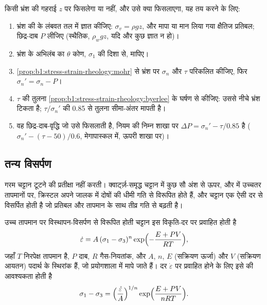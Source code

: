 \begin{method}[भ्रंश के फिसलने की जाँच]
\label{met:b1:stress-strain-rheology:slip-test}
किसी भ्रंश की गहराई $z$ पर फिसलेगा या नहीं, और उसे क्या फिसलाएगा, यह तय करने के लिए:
\begin{enumerate}
  \item भ्रंश की  के लंबवत तल में  ज्ञात कीजिए: $\sigma_v = \rho g z$, और मापा या मान लिया गया क्षैतिज प्रतिबल; छिद्र-दाब $P$ लीजिए (स्थैतिक, $\rho_w g z$, यदि और कुछ ज्ञात न हो)।
  \item भ्रंश के अभिलंब का $\theta$ कोण, $\sigma_1$ की दिशा से, मापिए।
  \item \cref{prop:b1:stress-strain-rheology:mohr} से भ्रंश पर $\sigma_n$ और $\tau$ परिकलित कीजिए, फिर $\sigma_n' = \sigma_n - P$।
  \item $\tau$ की तुलना \cref{prop:b1:stress-strain-rheology:byerlee} के घर्षण से कीजिए: उससे नीचे भ्रंश टिकता है; $\tau/\sigma_n'$ की 0.85 से तुलना सीमा-अंतर मापती है।
  \item वह छिद्र-दाब-वृद्धि जो उसे फिसलाती है, नियम की निम्न शाखा पर $\Delta P = \sigma_n' - \tau/0.85$ है ($\sigma_n' - (\tau - 50)/0.6$, मेगापास्कल में, ऊपरी शाखा पर)।
\end{enumerate}
\end{method}

\subsection*{तन्य विसर्पण}

गरम चट्टान टूटने की प्रतीक्षा नहीं करती। क्वार्ट्ज़-समृद्ध चट्टान में कुछ सौ अंश से ऊपर, और  में उच्चतर तापमानों पर, क्रिस्टल अपने जालक में दोषों की धीमी गति से विरूपित होते हैं, और चट्टान एक ऐसी दर से विसर्पित होती है जो प्रतिबल और तापमान के साथ तीव्र गति से बढ़ती है।

\begin{proposition}[घात-नियम विसर्पण]
\label{prop:b1:stress-strain-rheology:creep}
उच्च तापमान पर विस्थापन-विसर्पण से विरूपित होती चट्टान इस विकृति-दर पर प्रवाहित होती है
\[
  \dot\varepsilon = A\,(\sigma_1 - \sigma_3)^n \exp\Bigl(-\frac{E + PV}{RT}\Bigr),
\]
जहाँ $T$ निरपेक्ष तापमान है, $P$ दाब, $R$ गैस-नियतांक, और $A$, $n$, $E$ (सक्रियण ऊर्जा) और $V$ (सक्रियण आयतन) पदार्थ के स्थिरांक हैं, जो प्रयोगशाला में मापे जाते हैं। दर $\dot\varepsilon$ पर प्रवाहित होने के लिए इसे  की आवश्यकता होती है
\[
  \sigma_1 - \sigma_3 = \Bigl(\frac{\dot\varepsilon}{A}\Bigr)^{1/n}
  \exp\Bigl(\frac{E + PV}{nRT}\Bigr).
\]
\end{proposition}
\admitted

